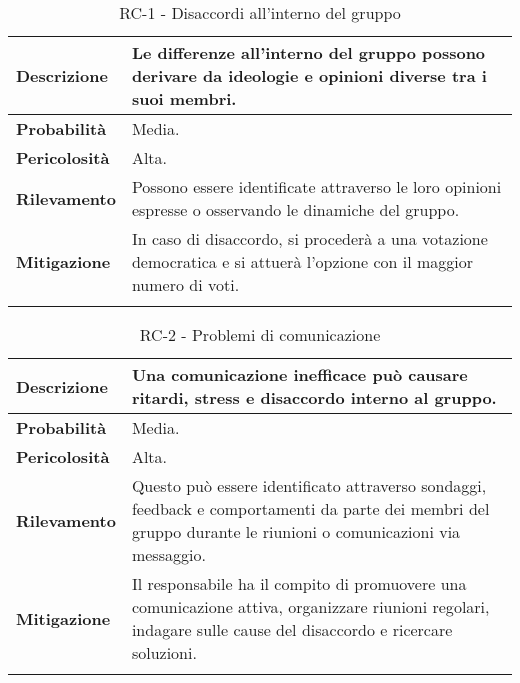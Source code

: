 \begin{longtable}{ | l | p{12cm} | }
	\hline
	\textbf{Descrizione}  & Le differenze all'interno del gruppo possono derivare da ideologie e opinioni diverse tra i suoi membri.              \\
	\hline
	\textbf{Probabilità}  & Media.                                                                                                                \\
	\hline
	\textbf{Pericolosità} & Alta.                                                                                                                 \\
	\hline
	\textbf{Rilevamento}  & Possono essere identificate attraverso le loro opinioni espresse o osservando le dinamiche del gruppo.                \\
	\hline
	\textbf{Mitigazione}  & In caso di disaccordo, si procederà a una votazione democratica e si attuerà l'opzione con il maggior numero di voti. \\
	\hline
	\caption{RC-1 - Disaccordi all'interno del gruppo}
\end{longtable}


\begin{longtable}{ | l | p{12cm} | }
	\hline
	\textbf{Descrizione}  & Una comunicazione inefficace può causare ritardi, stress e disaccordo interno al gruppo.                                                                        \\
	\hline
	\textbf{Probabilità}  & Media.                                                                                                                                                          \\
	\hline
	\textbf{Pericolosità} & Alta.                                                                                                                                                           \\
	\hline
	\textbf{Rilevamento}  & Questo può essere identificato attraverso sondaggi, feedback e comportamenti da parte dei membri del gruppo durante le riunioni o comunicazioni via messaggio.  \\
	\hline
	\textbf{Mitigazione}  & Il responsabile ha il compito di promuovere una comunicazione attiva, organizzare riunioni regolari, indagare sulle cause del disaccordo e ricercare soluzioni. \\
	\hline
	\caption{RC-2 - Problemi di comunicazione}
\end{longtable}
